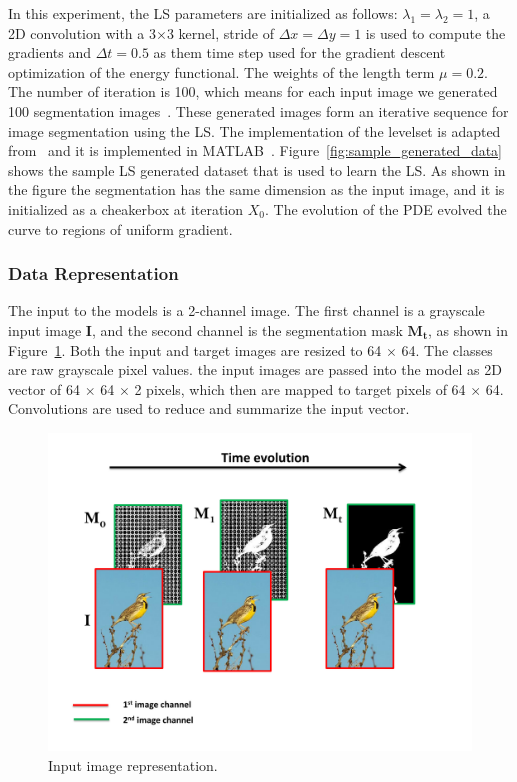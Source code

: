 \documentclass{WitsPhysicsReport}
\begin{document}
In this experiment, the LS parameters are initialized as follows: $\lambda_{1}=\lambda_{2}=1$, a 2D convolution with a 3$\times$3 kernel, stride of $\Delta x=\Delta y=1$  is used to compute the gradients and  $\Delta t =0.5$ 
as them time step used for the gradient descent optimization of the energy functional.  The weights of the length term $\mu =0.2$. The number of iteration is 100, which means for each input image we generated 100 segmentation images~\cite{akal2019learning}. These generated images form an iterative sequence for image segmentation using the LS. The implementation of the levelset is adapted from~\cite{chan2000active, vese2002multiphase} and it is implemented in MATLAB~\cite{MATLAB2010}. 
Figure~\ref{fig:sample_generated_data} shows the sample LS generated dataset that is used to learn the LS. As shown in the figure the segmentation has the same dimension as the input image, and it is initialized as a cheakerbox at iteration $X_{0}$. The evolution of the PDE evolved the curve to regions of uniform gradient.


\subsubsection{Data Representation}
\label{sec:data_representation}

The input to the models is a 2-channel image. The first channel is a grayscale input image $\mathbf{I}$, and the second channel is the segmentation mask $\mathbf{M_{t}}$, as shown in Figure~\ref{fig:input_image_reprentation}. Both the input and target images are resized to 64 $\times$ 64. The classes are raw grayscale pixel values.
the input images are passed into the model as 2D vector of  64 $\times$ 64 $\times$ 2 pixels, which then are mapped to target pixels of 64 $\times$ 64. Convolutions are used to reduce and summarize the input vector.


\begin{figure}[H]
\centering
  \includegraphics[width=1\textwidth]{Figure/esn_input.pdf}
 \caption{Input image representation.}
 \label{fig:input_image_reprentation}
\end{figure}
\end{document}
